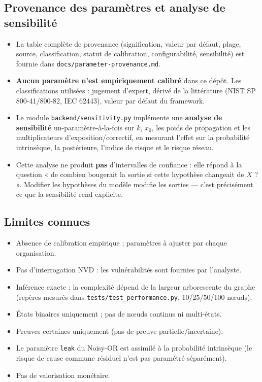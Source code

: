 \documentclass[12pt,a4paper]{article}
\newcommand{\forcereset}[1]{%
    \needspace{#1\baselineskip}%
}
\begin{document}
\subsection{Provenance des paramètres et analyse de sensibilité}
\forcereset{4}
\begin{itemize}[leftmargin=1.2cm, itemsep=0.2\baselineskip]
    \item La table complète de provenance (signification, valeur par défaut, plage, source, classification, statut de calibration, configurabilité, sensibilité) est fournie dans \texttt{docs/parameter-provenance.md}.
    \item \textbf{Aucun paramètre n'est empiriquement calibré} dans ce dépôt. Les classifications utilisées : jugement d'expert, dérivé de la littérature (NIST SP 800-41/800-82, IEC 62443), valeur par défaut du framework.
    \item Le module \texttt{backend/sensitivity.py} implémente une \textbf{analyse de sensibilité} un-paramètre-à-la-fois sur $k$, $x_0$, les poids de propagation et les multiplicateurs d'exposition/correctif, en mesurant l'effet sur la probabilité intrinsèque, la postérieure, l'indice de risque et le risque réseau.
    \item Cette analyse ne produit \textbf{pas} d'intervalles de confiance : elle répond à la question « de combien bougerait la sortie si cette hypothèse changeait de $X$ ? ». Modifier les hypothèses du modèle modifie les sorties — c'est précisément ce que la sensibilité rend explicite.
\end{itemize}

\subsection{Limites connues}
\forcereset{4}
\begin{itemize}[leftmargin=1.2cm, itemsep=0.2\baselineskip]
    \item Absence de calibration empirique ; paramètres à ajuster par chaque organisation.
    \item Pas d'interrogation NVD : les vulnérabilités sont fournies par l'analyste.
    \item Inférence exacte : la complexité dépend de la largeur arborescente du graphe (repères mesurés dans \texttt{tests/test\_performance.py}, 10/25/50/100 nœuds).
    \item États binaires uniquement ; pas de nœuds continus ni multi-états.
    \item Preuves certaines uniquement (pas de preuve partielle/incertaine).
    \item Le paramètre \texttt{leak} du Noisy-OR est assimilé à la probabilité intrinsèque (le risque de cause commune résiduel n'est pas paramétré séparément).
    \item Pas de valorisation monétaire.
\end{itemize}
\end{document}

